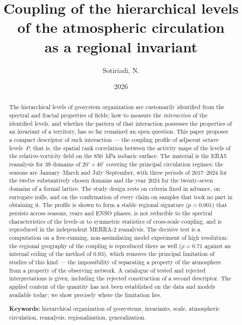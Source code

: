\documentclass[11pt,a4paper]{article}
\title{Coupling of the hierarchical levels of the atmospheric circulation\\
as a regional invariant}
\author{Sotiriadi, N.}
\date{2026}
\begin{document}
\maketitle

\begin{abstract}
The hierarchical levels of geosystem organization are customarily identified from the spectral and fractal properties of fields; how to measure the \emph{interaction} of the identified levels, and whether the pattern of that interaction possesses the properties of an invariant of a territory, has so far remained an open question. This paper proposes a compact descriptor of such interaction --- the coupling profile of adjacent octave levels~$P$, that is, the spatial rank correlation between the activity maps of the levels of the relative-vorticity field on the 850~hPa isobaric surface. The material is the ERA5 reanalysis for 39 domains of $20^\circ\times40^\circ$ covering the principal circulation regimes; the seasons are January--March and July--September, with three periods of 2017--2024 for the twelve substantively chosen domains and the year 2024 for the twenty-seven domains of a formal lattice. The study design rests on criteria fixed in advance, on surrogate nulls, and on the confirmation of every claim on samples that took no part in obtaining it. The profile is shown to form a stable regional signature ($p=0.001$) that persists across seasons, years and ENSO phases, is not reducible to the spectral characteristics of the levels or to symmetric statistics of cross-scale coupling, and is reproduced in the independent MERRA-2 reanalysis. The decisive test is a computation on a free-running, non-assimilating model experiment of high resolution: the regional geography of the coupling is reproduced there as well ($\rho=0.71$ against an internal ceiling of the method of $0.93$), which removes the principal limitation of studies of this kind --- the impossibility of separating a property of the atmosphere from a property of the observing network. A catalogue of tested and rejected interpretations is given, including the rejected construction of a second descriptor. The applied content of the quantity has not been established on the data and models available today; we show precisely where the limitation lies.

\smallskip
\noindent\textbf{Keywords:} hierarchical organization of geosystems, invariants, scale, atmospheric circulation, reanalysis, regionalization, generalization.
\end{abstract}
\end{document}
